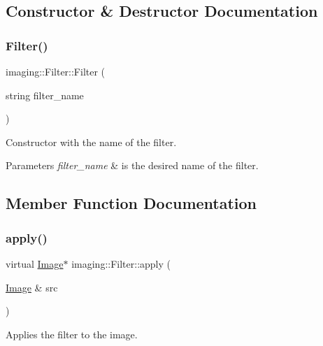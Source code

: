 \subsection{Constructor \& Destructor Documentation}
\mbox{\label{classimaging_1_1_filter_a7ed3a34cf602ecd25b9671536a31f9b2}} 
\subsubsection{\texorpdfstring{Filter()}{Filter()}}
{\footnotesize\ttfamily imaging\+::\+Filter\+::\+Filter (\begin{DoxyParamCaption}\item[{string}]{filter\+\_\+name }\end{DoxyParamCaption})\hspace{0.3cm}{\ttfamily [inline]}}

Constructor with the name of the filter.


\begin{DoxyParams}{Parameters}
{\em filter\+\_\+name} & is the desired name of the filter. \\
\hline
\end{DoxyParams}


\subsection{Member Function Documentation}
\mbox{\label{classimaging_1_1_filter_ab153f2e4e89dd744806299a29da8289b}} 
\subsubsection{\texorpdfstring{apply()}{apply()}}
{\footnotesize\ttfamily virtual \hyperlink{classimaging_1_1_image}{Image}$\ast$ imaging\+::\+Filter\+::apply (\begin{DoxyParamCaption}\item[{\hyperlink{classimaging_1_1_image}{Image} \&}]{src }\end{DoxyParamCaption})\hspace{0.3cm}{\ttfamily [pure virtual]}}

Applies the filter to the image.


